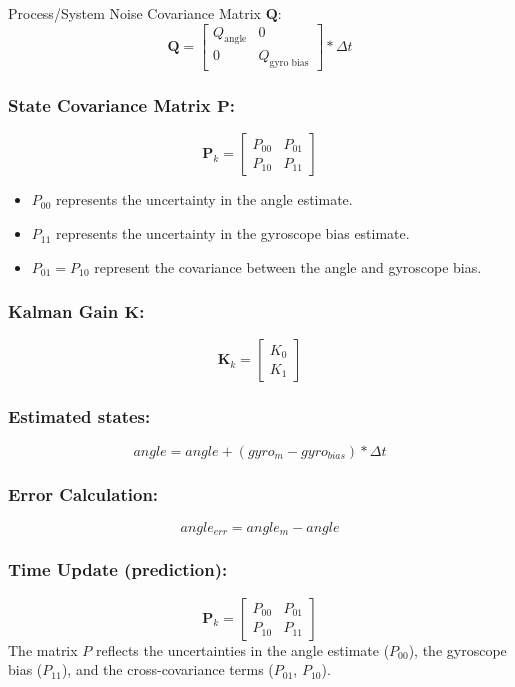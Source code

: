 Process/System Noise Covariance Matrix $\mathbf{Q}$:
$$
\mathbf{Q} = \begin{bmatrix} Q_{\text{angle}} & 0 \\ 0 & Q_{\text{gyro bias}} \end{bmatrix} * \Delta t
$$

\subsubsection{
	State Covariance Matrix $\mathbf{P}$:
}
$$
\mathbf{P}_k = \begin{bmatrix} P_{00} & P_{01} \\ P_{10} & P_{11} \end{bmatrix}
$$
\begin{itemize}
	\item $P_{00}$ represents the uncertainty in the angle estimate.
	\item $P_{11}$ represents the uncertainty in the gyroscope bias estimate.
	\item $P_{01} = P_{10}$ represent the covariance between the angle and gyroscope bias.
\end{itemize}

\subsubsection{
	Kalman Gain $\mathbf{K}$:
}
$$
\mathbf{K}_k = \begin{bmatrix} K_{0} \\ K_{1} \end{bmatrix}
$$

\subsubsection{
	Estimated states: 
}
$$
angle = angle + (gyro_{m} - gyro_{bias}) * \Delta t
$$

\subsubsection{
	Error Calculation:
}
$$
angle_{err} = angle_{m} - angle
$$

\subsubsection{
	Time Update (prediction):
}
$$
\mathbf{P}_k = \begin{bmatrix} P_{00} & P_{01} \\ P_{10} & P_{11} \end{bmatrix}
$$
The matrix $P$ reflects the uncertainties in the angle estimate ($P_{00}$), the gyroscope bias ($P_{11}$), and the cross-covariance terms ($P_{01}$, $P_{10}$).

